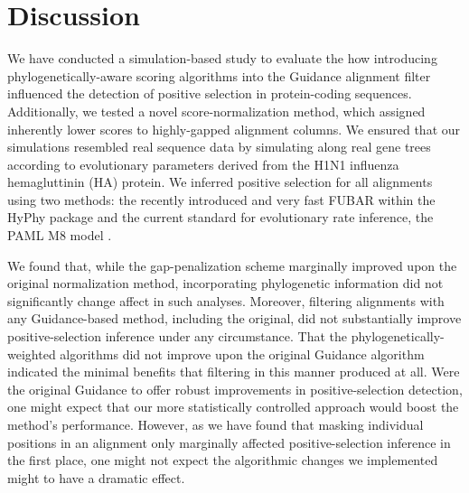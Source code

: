 \documentclass[10pt]{article}
\begin{document}
\section*{Discussion}

We have conducted a simulation-based study to evaluate the how introducing phylogenetically-aware scoring algorithms into the Guidance alignment filter influenced the detection of positive selection in protein-coding sequences. Additionally, we tested a novel score-normalization method, which assigned inherently lower scores to highly-gapped alignment columns. We ensured that our simulations resembled real sequence data by simulating along real gene trees according to evolutionary parameters derived from the H1N1 influenza hemagluttinin (HA) protein. We inferred positive selection for all alignments using two methods: the recently introduced and very fast FUBAR \citep{Murrell2013} within the HyPhy package \citep{Pond2005} and the current standard for evolutionary rate inference, the PAML M8 model \citep{Yang2007}.

We found that, while the gap-penalization scheme marginally improved upon the original normalization method, incorporating phylogenetic information did not significantly change affect in such analyses. Moreover, filtering alignments with any Guidance-based method, including the original, did not substantially improve positive-selection inference under any circumstance. That the phylogenetically-weighted algorithms did not improve upon the original Guidance algorithm indicated the minimal benefits that filtering in this manner produced at all. Were the original Guidance to offer robust improvements in positive-selection detection, one might expect that our more statistically controlled approach would boost the method's performance. However, as we have found that masking individual positions in an alignment only marginally affected positive-selection inference in the first place, one might not expect the algorithmic changes we implemented might to have a dramatic effect.
\end{document}

